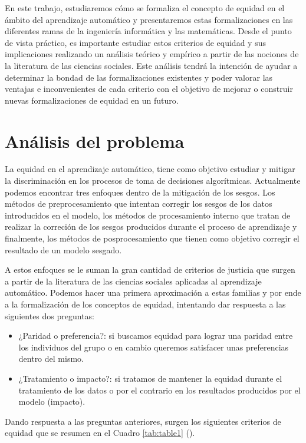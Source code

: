 \documentclass[oneside,openright,titlepage,numbers=noenddot,openany,headinclude,footinclude=true,
cleardoublepage=empty,abstractoff,BCOR=5mm,paper=a4,fontsize=12pt,main=spanish]{scrreprt}
\begin{document}
En este trabajo, estudiaremos cómo se formaliza el concepto de equidad en el ámbito del aprendizaje automático y presentaremos estas formalizaciones en las diferentes ramas de la ingeniería informática y las matemáticas. Desde el punto de vista práctico, es importante estudiar estos criterios de equidad y sus implicaciones realizando un análisis teórico y empírico a partir de las nociones de la literatura de las ciencias sociales. Este análisis tendrá la intención de ayudar a determinar la bondad de las formalizaciones existentes y poder valorar las ventajas e inconvenientes de cada criterio con el objetivo de mejorar o construir nuevas formalizaciones de equidad en un futuro. 

\section{Análisis del problema}

La equidad en el aprendizaje automático, tiene como objetivo estudiar y mitigar la discriminación en los procesos de toma de decisiones algorítmicas. Actualmente podemos encontrar tres enfoques dentro de la mitigación de los sesgos. Los métodos de preprocesamiento que intentan corregir los sesgos de los datos introducidos en el modelo, los métodos de procesamiento interno que tratan de realizar la correción de los sesgos producidos durante el proceso de aprendizaje y finalmente, los métodos de posprocesamiento que tienen como objetivo corregir el resultado de un modelo sesgado.

A estos enfoques se le suman la gran cantidad de criterios de justicia que surgen a partir de la literatura de las ciencias sociales aplicadas al aprendizaje automático. Podemos hacer una primera aproximación a estas familias y por ende a la formalización de los conceptos de equidad, intentando dar respuesta a las siguientes dos preguntas:

\begin{itemize}
    \item ¿Paridad o preferencia?: si buscamos equidad para lograr una paridad entre los individuos del grupo o en cambio queremos satisfacer unas preferencias dentro del mismo.
    \item ¿Tratamiento o impacto?: si tratamos de mantener la equidad durante el tratamiento de los datos o por el contrario en los resultados producidos por el modelo (impacto).
\end{itemize}

Dando respuesta a las preguntas anteriores, surgen los siguientes criterios de equidad que se resumen en el Cuadro \ref{tab:table1} (\cite{formalizing2018}).\\
\end{document}
